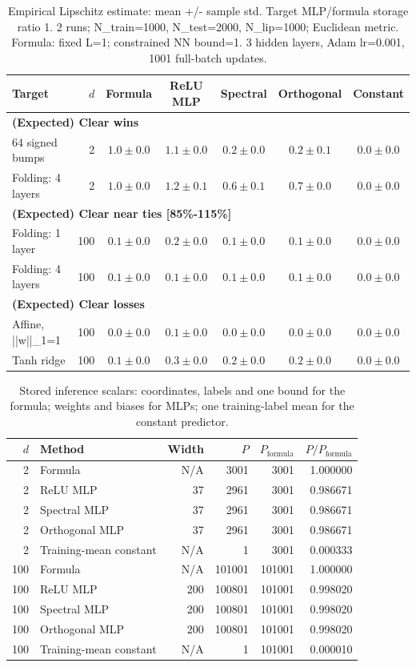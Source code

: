 \documentclass{article}
\begin{document}
\begin{table}[t]
\centering
\scriptsize
\setlength{\tabcolsep}{3pt}
\caption{Empirical Lipschitz estimate: mean +/- sample std. Target MLP/formula storage ratio 1. 2 runs; N\_train=1000, N\_test=2000, N\_lip=1000; Euclidean metric. Formula: fixed L=1; constrained NN bound=1. 3 hidden layers, Adam lr=0.001, 1001 full-batch updates.}
\begin{tabular}{lrccccc}
\hline
Target & $d$ & Formula & ReLU MLP & Spectral & Orthogonal & Constant \\
\hline
\multicolumn{7}{l}{\textbf{(Expected) Clear wins}} \\
64 signed bumps & 2 & $1.0\pm 0.0$ & $1.1\pm 0.0$ & $0.2\pm 0.0$ & $0.2\pm 0.1$ & $0.0\pm 0.0$ \\
Folding: 4 layers & 2 & $1.0\pm 0.0$ & $1.2\pm 0.1$ & $0.6\pm 0.1$ & $0.7\pm 0.0$ & $0.0\pm 0.0$ \\
\hline
\multicolumn{7}{l}{\textbf{(Expected) Clear near ties [85\%-115\%]}} \\
Folding: 1 layer & 100 & $0.1\pm 0.0$ & $0.2\pm 0.0$ & $0.1\pm 0.0$ & $0.1\pm 0.0$ & $0.0\pm 0.0$ \\
Folding: 4 layers & 100 & $0.1\pm 0.0$ & $0.1\pm 0.0$ & $0.1\pm 0.0$ & $0.1\pm 0.0$ & $0.0\pm 0.0$ \\
\hline
\multicolumn{7}{l}{\textbf{(Expected) Clear losses}} \\
Affine, ||w||\_1=1 & 100 & $0.0\pm 0.0$ & $0.1\pm 0.0$ & $0.0\pm 0.0$ & $0.0\pm 0.0$ & $0.0\pm 0.0$ \\
Tanh ridge & 100 & $0.1\pm 0.0$ & $0.3\pm 0.0$ & $0.2\pm 0.0$ & $0.2\pm 0.0$ & $0.0\pm 0.0$ \\
\hline
\end{tabular}
\end{table}
\clearpage
\begin{table}[t]
\centering
\scriptsize
\caption{Stored inference scalars: coordinates, labels and one bound for the formula; weights and biases for MLPs; one training-label mean for the constant predictor.}
\begin{tabular}{rlrrrr}
\hline
$d$ & Method & Width & $P$ & $P_{\mathrm{formula}}$ & $P/P_{\mathrm{formula}}$ \\
\hline
2 & Formula & N/A & 3001 & 3001 & 1.000000 \\
2 & ReLU MLP & 37 & 2961 & 3001 & 0.986671 \\
2 & Spectral MLP & 37 & 2961 & 3001 & 0.986671 \\
2 & Orthogonal MLP & 37 & 2961 & 3001 & 0.986671 \\
2 & Training-mean constant & N/A & 1 & 3001 & 0.000333 \\
100 & Formula & N/A & 101001 & 101001 & 1.000000 \\
100 & ReLU MLP & 200 & 100801 & 101001 & 0.998020 \\
100 & Spectral MLP & 200 & 100801 & 101001 & 0.998020 \\
100 & Orthogonal MLP & 200 & 100801 & 101001 & 0.998020 \\
100 & Training-mean constant & N/A & 1 & 101001 & 0.000010 \\
\hline
\end{tabular}
\end{table}
\end{document}
